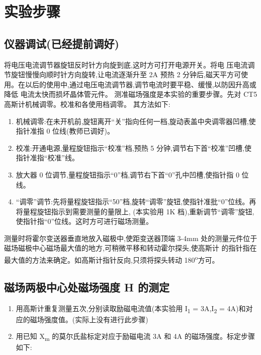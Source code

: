 \documentclass[11pt]{report}
\begin{document}
\chapter{实验步骤}
\label{sec:org0be8f80}
\section{仪器调试(已经提前调好)}
\label{sec:orgf459c7e}
    将电压电流调节器旋钮反时针方向旋到底,这时方可打开电源开关。将电
压电流调节旋钮慢慢向顺时针方向旋转,让电流逐渐升至 2A 预热 2 分钟后,磁天平方可使
用。在以后的使用中,通过电压电流调节器,调节电流时要平稳、缓慢,以防因升高或降低
电流太快而损坏晶体管元件。
测准磁场强度是本实验的重要步骤。先对 CT5 高斯计机械调零。校准和各使用档调零。
其方法如下:
\begin{enumerate}
\item 机械调零:在未开机前,旋钮离开“关”指向任何一档,旋动表盖中央调零器凹槽,使指针准指 0 位线(教师已调好)。
\item 校准:开通电源,量程旋钮指示“校准”档,预热 5 分钟,调节右下首“校准”凹槽,使指针准指“校准”线。
\item 放大器 0 位调节,量程旋钮指示“0”档,调节右下首“0”孔中凹槽,使指针指 0 位线。
\item “调零”调节:先将量程旋钮指示“50”档,旋转“调零”旋钮,使指针准批“0”位线。再将量程旋钮指示到需要测量的量限上, (本实验用 1K 档),重新调节“调零”旋钮,使指针指“0”位线。这时方可进行磁场测量。
\end{enumerate}

测量时将霍尔变送器垂直地放入磁极中,使距变送器顶端 3-4mm
处的测量元件位于磁场磁极中心磁场最大值的地方,可稍微平移和转动霍尔探头,使高斯计
的指针指在最大值的方法来确定。如高斯计指针反向,只须将探头转动 180\textsuperscript{o}方可。

\section{磁场两极中心处磁场强度 H 的测定}
\label{sec:org482b303}
\begin{enumerate}
\item 用高斯计重复测量五次,分别读取励磁电流值(本实验用 I\textsubscript{1} = 3A,I\textsubscript{2} = 4A)和对应的磁场强度值。(实际上没有进行此步骤)

\item 用已知 X\textsubscript{m} 的莫尔氏盐标定对应于励磁电流 3A 和 4A 的磁场强度。标定步骤如下:
\end{enumerate}
\end{document}
